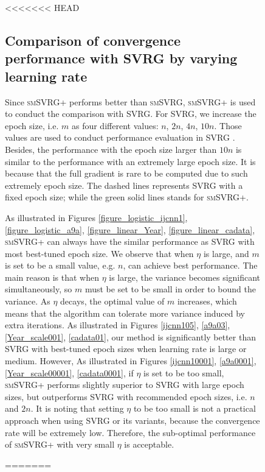 \documentclass[conference]{IEEEtran}
\begin{document}
\begin{itemize}
\begin{figure}[ht]
\begin{figure}[ht]
\end{figure}

<<<<<<< HEAD
 \subsection{Comparison of convergence performance with SVRG by varying learning rate}
Since \textsc{smSVRG+} performs better than \textsc{smSVRG}, \textsc{smSVRG+} is used to conduct the comparison with SVRG. For SVRG, we increase the epoch size, i.e. $m$ as four different values: $n$, $2n$, $4n$, $10n$. Those values are used to conduct performance evaluation in SVRG \citep{Johnson:9MAvkbgy}.  Besides, the performance with the epoch size larger than $10n$ is similar  to the performance with an extremely large epoch size. It is because that the full gradient is rare to be computed due to such extremely epoch size. The dashed lines represents SVRG with a fixed epoch size; while the green solid lines stands for \textsc{smSVRG+}.

As illustrated in Figures \ref{figure_logistic_ijcnn1}, \ref{figure_logistic_a9a}, \ref{figure_linear_Year}, \ref{figure_linear_cadata},  \textsc{smSVRG+} can always have the similar performance as SVRG with most best-tuned epoch size. We observe that when $\eta$ is large,  and $m$ is set to be a small value, e.g. $n$, can achieve best performance. The main reason is that when $\eta$ is large, the variance becomes significant simultaneously, so $m$ must be set to be small in order to bound the variance. As $\eta$ decays, the optimal value of $m$ increases, which means that the algorithm can tolerate more variance induced by extra iterations. As illustrated in Figures \ref{ijcnn105}, \ref{a9a03}, \ref{Year_scale001}, \ref{cadata01}, our method is significantly better than SVRG with best-tuned epoch sizes when learning rate is large or medium. However, As illustrated in Figures \ref{ijcnn10001}, \ref{a9a0001}, \ref{Year_scale00001}, \ref{cadata0001}, if $\eta$ is set to be too small, \textsc{smSVRG+} performs slightly superior to  SVRG with large epoch sizes, but outperforms SVRG with recommended epoch sizes, i.e. $n$ and $2n$. It is noting that setting $\eta$ to be too small is not a practical approach when using SVRG or its variants, because the convergence rate will be extremely low. Therefore, the sub-optimal performance of \textsc{smSVRG+} with very small $\eta$ is acceptable.

=======


\end{figure}
\end{itemize}
\end{document}
